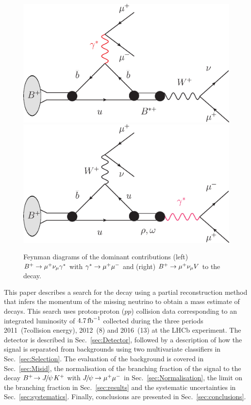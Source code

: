 \begin{figure}[ht]
  \begin{center}
    \includegraphics[width=0.45\linewidth]{Figure_1A.eps}
	  \hspace*{1.0cm}
    \includegraphics[width=0.45\linewidth]{Figure_1B.eps}
    \vspace*{-0.5cm}
  \end{center}
  \caption{Feynman diagrams of the dominant contributions (left)
    ${{{B}^+}}\rightarrow{\ensuremath{\mu^+}}{\ensuremath{{\nu}_\mu}}\gamma^{*}$ with $\gamma^{*}\rightarrow{\ensuremath{\mu^+\mu^-}}$ and (right)
    ${{{B}^+}}\rightarrow{\ensuremath{\mu^+}}{\ensuremath{{\nu}_\mu}} V$ to the \Bmumumu decay.}
  \label{fig:feyn}
\end{figure}

This paper describes a search for the decay \Bmumumu using a partial
reconstruction method that infers the momentum of the missing neutrino to
obtain a mass 
estimate of \Bmumumu decays. This search uses proton-proton ($pp$) collision
data corresponding to an integrated luminosity of $4.7\mbox{\,fb}^{-1}$ collected during the  three periods 2011~(7\tev collision energy), 2012~(8\tev) and 2016~(13\tev)
at the LHCb experiment. The detector is described in Sec.~\ref{sec:Detector}, followed by a description of how
the signal is separated from backgrounds using two multivariate classifiers in Sec.~\ref{sec:Selection}. The
evaluation of the background is covered in Sec.~\ref{sec:Misid}, the normalisation of the branching fraction of
the signal to the decay ${{{B}^+}}\!\rightarrow {\ensuremath{{J\mskip -3mu/\mskip -2mu\psi\mskip 2mu}}} {\ensuremath{{K}^+}}$ with ${{J\mskip -3mu/\mskip -2mu\psi\mskip 2mu}}\!\rightarrow {\ensuremath{\mu^+}}{\ensuremath{\mu^-}}$ in Sec.~\ref{sec:Normalisation},
the limit on the branching fraction in Sec.~\ref{sec:results} and the systematic uncertainties in
Sec.~\ref{sec:systematics}. Finally, conclusions are presented in Sec.~\ref{sec:conclusions}.
